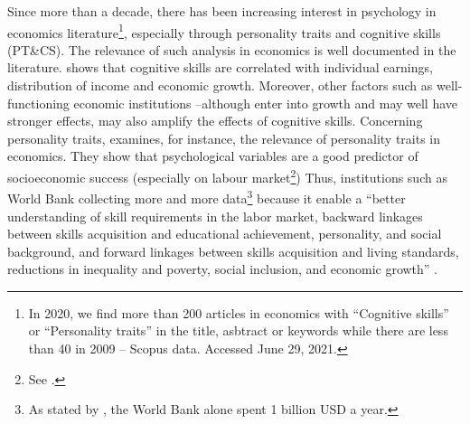 \documentclass[a4paper, 11pt, onecolumn]{article}
\begin{document}
Since more than a decade, there has been increasing interest in psychology in economics literature\footnote{In 2020, we find more than 200 articles in economics with ``Cognitive skills'' or ``Personality traits'' in the title, asbtract or keywords while there are less than 40 in 2009 -- Scopus data. Accessed June 29, 2021.}, especially through personality traits and cognitive skills (PT\&CS).
The relevance of such analysis in economics is well documented in the literature.
\cite{Hanushek2008} shows that cognitive skills are correlated with individual earnings, distribution of income and economic growth.
Moreover, other factors such as well-functioning economic institutions --although enter into growth and may well have stronger effects, may also amplify the effects of cognitive skills.
Concerning personality traits, \cite{Borghans2008} examines, for instance, the relevance of personality traits in economics.
They show that psychological variables are a good predictor of socioeconomic success (especially on labour market\footnote{See \cite{Almlund2011}.}) 
Thus, institutions such as World Bank collecting more and more data\footnote{As stated by \cite{Laajaj2019b}, the World Bank alone spent 1 billion USD a year.} because it enable a ``better understanding of skill requirements in the labor market, backward linkages between skills acquisition and educational achievement, personality, and social background, and forward linkages between skills acquisition and living standards, reductions in inequality and poverty, social inclusion, and economic growth'' \citep{STEP2014}.
\end{document}
